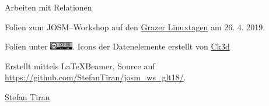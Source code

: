 \documentclass{beamer}
\begin{document}
\begin{frame}{Arbeiten mit Relationen}
\end{frame}

\begin{frame}
Folien zum JOSM--Workshop auf den
\href{http://http://linuxtage.at/}{Grazer Linuxtagen} am 26. 4. 2019.
\vspace{1cm}

Folien unter \includegraphics[width=1cm]{cc-by-sa.png}.
Icons der Datenelemente erstellt von \href{https://wiki.openstreetmap.org/wiki/User:Ck3d}{Ck3d}
\vspace{1cm}

Erstellt mittels \LaTeX Beamer, Source auf \url{https://github.com/StefanTiran/josm_ws_glt18/}.
\vspace{1cm}

\href{mailto:osm@stefantiran.at}{Stefan Tiran}
\end{frame}
\end{document}
